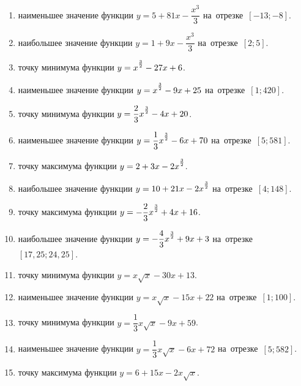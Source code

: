 \documentclass[a4paper,10pt]{article}
\begin{document}
\begin{enumerate}
\item {} наименьшее значение функции $y=5 +81x-\dfrac{x^3}{3}$ на~отрезке~$\left[-13;-8\right]$.

\item {} наибольшее значение функции $y=1 +9x-\dfrac{x^3}{3}$ на~отрезке~$\left[2;5\right]$.

\item {} точку минимума функции $y=x\strut^{\frac{3}{2}} -27x+6$.

\item {} наименьшее значение функции $y=x\strut^{\frac{3}{2}} -9x+25$ на~отрезке~$\left[1;420\right]$.

\item {} точку минимума функции $y=\dfrac{2}{3}x\strut^{\frac{3}{2}} -4x+20$.

\item {} наименьшее значение функции $y=\dfrac{1}{3}x\strut^{\frac{3}{2}} -6x+70$ на~отрезке~$\left[5;581\right]$.

\item {} точку максимума функции $y=2+3x-2x\strut^{\frac{3}{2}}$.

\item {} наибольшее значение функции $y=10+21x-2x\strut^{\frac{3}{2}}$ на~отрезке~$\left[4;148\right]$.

\item {} точку максимума функции $y=-\dfrac{2}{3}x\strut^{\frac{3}{2}} +4x+16$.

\item {} наибольшее значение функции $y=-\dfrac{4}{3}x\strut^{\frac{3}{2}} +9x+3$ на~отрезке~$\left[17,25;24,25\right]$.

\item {} точку минимума функции $y=x\sqrt{x} -30x+13$.

\item {} наименьшее значение функции $y=x\sqrt{x} -15x+22$ на~отрезке~$\left[1;100\right]$.

\item {} точку минимума функции $y=\dfrac{1}{3}x\sqrt{x} -9x+59$.

\item {} наименьшее значение функции $y=\dfrac{1}{3}x\sqrt{x} -6x+72$ на~отрезке~$\left[5;582\right]$.

\item {} точку максимума функции $y=6+15x -2x\sqrt{x}$.


\end{enumerate}
\end{document}
